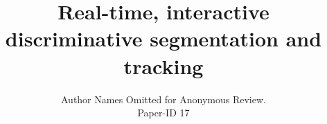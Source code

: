 \documentclass[conference]{IEEEtran}
\begin{document}
\title{Real-time, interactive \\ discriminative segmentation and tracking}

\author{Author Names Omitted for Anonymous Review. \\ Paper-ID 17}





% 


\maketitle
\end{document}

